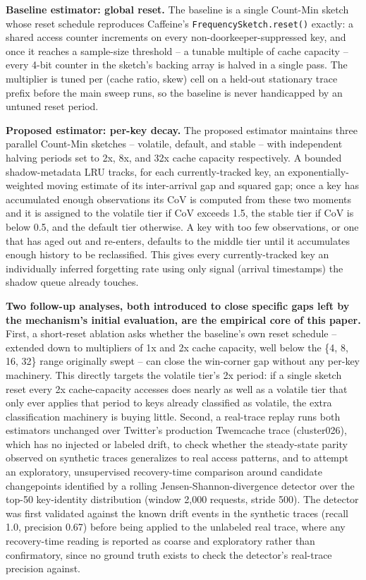 \documentclass[11pt,letterpaper]{article}
\begin{document}
\textbf{Baseline estimator: global reset.} The baseline is a single Count-Min sketch whose reset schedule reproduces Caffeine's \texttt{FrequencySketch.reset()} exactly: a shared access counter increments on every non-doorkeeper-suppressed key, and once it reaches a sample-size threshold -- a tunable multiple of cache capacity -- every 4-bit counter in the sketch's backing array is halved in a single pass. The multiplier is tuned per (cache ratio, skew) cell on a held-out stationary trace prefix before the main sweep runs, so the baseline is never handicapped by an untuned reset period.

\textbf{Proposed estimator: per-key decay.} The proposed estimator maintains three parallel Count-Min sketches -- volatile, default, and stable -- with independent halving periods set to 2x, 8x, and 32x cache capacity respectively. A bounded shadow-metadata LRU tracks, for each currently-tracked key, an exponentially-weighted moving estimate of its inter-arrival gap and squared gap; once a key has accumulated enough observations its CoV is computed from these two moments and it is assigned to the volatile tier if CoV exceeds 1.5, the stable tier if CoV is below 0.5, and the default tier otherwise. A key with too few observations, or one that has aged out and re-enters, defaults to the middle tier until it accumulates enough history to be reclassified. This gives every currently-tracked key an individually inferred forgetting rate using only signal (arrival timestamps) the shadow queue already touches.

\textbf{Two follow-up analyses, both introduced to close specific gaps left by the mechanism's initial evaluation, are the empirical core of this paper.} First, a short-reset ablation asks whether the baseline's own reset schedule -- extended down to multipliers of 1x and 2x cache capacity, well below the \{4, 8, 16, 32\} range originally swept -- can close the win-corner gap without any per-key machinery. This directly targets the volatile tier's 2x period: if a single sketch reset every 2x cache-capacity accesses does nearly as well as a volatile tier that only ever applies that period to keys already classified as volatile, the extra classification machinery is buying little. Second, a real-trace replay runs both estimators unchanged over Twitter's production Twemcache trace (cluster026), which has no injected or labeled drift, to check whether the steady-state parity observed on synthetic traces generalizes to real access patterns, and to attempt an exploratory, unsupervised recovery-time comparison around candidate changepoints identified by a rolling Jensen-Shannon-divergence detector over the top-50 key-identity distribution (window 2,000 requests, stride 500). The detector was first validated against the known drift events in the synthetic traces (recall 1.0, precision 0.67) before being applied to the unlabeled real trace, where any recovery-time reading is reported as coarse and exploratory rather than confirmatory, since no ground truth exists to check the detector's real-trace precision against.
\end{document}
